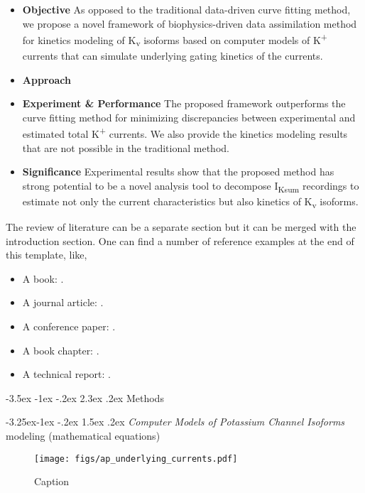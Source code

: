 \documentclass[11pt]{article}
\makeatletter
\renewcommand\section{\@startsection {section}{1}{\z@}%
                                   {-3.5ex \@plus -1ex \@minus -.2ex}%
                                   {2.3ex \@plus.2ex}%
                                   {\normalfont\fontfamily{phv}\fontsize{16}{19}\bfseries}}
\renewcommand\subsection{\@startsection{subsection}{2}{\z@}%
                                     {-3.25ex\@plus -1ex \@minus -.2ex}%
                                     {1.5ex \@plus .2ex}%
                                     {\normalfont\fontfamily{phv}\fontsize{14}{17}\bfseries}}
\makeatother
\begin{document}
\begin{itemize}
    \item \textbf{Objective} As opposed to the traditional data-driven curve fitting method, we propose a novel framework of biophysics-driven data assimilation method for kinetics modeling of K\textsubscript{v} isoforms based on computer models of K\textsuperscript{+} currents that can simulate underlying gating kinetics of the currents.
    \item \textbf{Approach} 
    \item \textbf{Experiment \& Performance} The proposed framework outperforms the curve fitting method for minimizing discrepancies between experimental and estimated total K\textsuperscript{+} currents. We also provide the kinetics modeling results that are not possible in the traditional method.
    \item \textbf{Significance} Experimental results show that the proposed method has strong potential to be a novel analysis tool to decompose I\textsubscript{Ksum} recordings to estimate not only the current characteristics but also kinetics of K\textsubscript{v} isoforms.
\end{itemize}

The review of literature can be a separate section but it can be merged with the introduction section. One can find a number of reference examples at the end of this template, like,
\begin{itemize}
\item A book: \cite{Hastie2009}.
\item A journal article: \cite{Byon2013}.
\item A conference paper: \cite{Breunig2000}.
\item A book chapter: \cite{Yang2010}.
\item A technical report: \cite{Kelley2007}.
\end{itemize}

\section{Methods} \label{s:methods}

\subsection{\emph{Computer Models of Potassium Channel Isoforms}} \label{s:methods.1}
modeling (mathematical equations)
\begin{figure}
    \centering
    \texttt{[image: figs/ap\_underlying\_currents.pdf]}
    \caption{Caption}
    \label{fig:ap_underlying_currents}
\end{figure}
\end{document}
